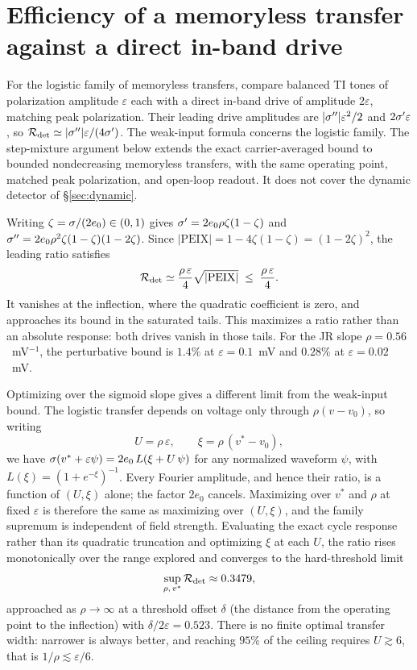 \section{Efficiency of a memoryless transfer against a direct in-band drive}\label{app:bound}
For the logistic family of memoryless transfers, compare balanced TI tones of
polarization amplitude $\varepsilon$ each with a direct in-band drive of amplitude
$2\varepsilon$, matching peak polarization. Their leading drive amplitudes are
$|\sigma''|\varepsilon^2/2$ and $2\sigma'\varepsilon$, so
$\mathcal R_{\rm det}\simeq|\sigma''|\varepsilon/(4\sigma')$.
The weak-input formula concerns the logistic family. The step-mixture argument
below extends the exact carrier-averaged bound to bounded nondecreasing
memoryless transfers, with the same operating point, matched peak polarization,
and open-loop readout. It does not cover the dynamic detector of \S\ref{sec:dynamic}.

Writing $\zeta=\sigma/(2e_0)\in(0,1)$ gives
$\sigma'=2e_0\rho\zeta(1-\zeta)$ and
$\sigma''=2e_0\rho^2\zeta(1-\zeta)(1-2\zeta)$. Since
$|\mathrm{PEIX}|=1-4\zeta(1-\zeta)=(1-2\zeta)^2$, the leading ratio satisfies
\begin{equation}
\mathcal R_{\rm det}\simeq\frac{\rho\,\varepsilon}{4}\sqrt{|\mathrm{PEIX}|}
\;\le\;\frac{\rho\,\varepsilon}{4}.
\label{eq:etabound}
\end{equation}
It vanishes at the inflection, where the quadratic coefficient is zero, and
approaches its bound in the saturated tails. This maximizes a ratio rather than
an absolute response: both drives vanish in those tails. For the JR slope
$\rho=0.56$~mV$^{-1}$, the perturbative bound is $1.4\%$ at
$\varepsilon=0.1$~mV and $0.28\%$ at $\varepsilon=0.02$~mV.

Optimizing over the sigmoid slope gives a different limit from the weak-input bound.
The logistic transfer depends on voltage only through $\rho(v-v_0)$, so writing
\begin{equation}
U=\rho\,\varepsilon,\qquad \xi=\rho\,(v^*-v_0),
\label{eq:reduced}
\end{equation}
we have $\sigma(v^*+\varepsilon\psi)=2e_0\,L(\xi+U\,\psi)$ for any normalized waveform $\psi$,
with $L(\xi)=(1+e^{-\xi})^{-1}$. Every Fourier amplitude, and hence their ratio, is a function
of $(U,\xi)$ alone; the factor $2e_0$ cancels. Maximizing over $v^*$ and $\rho$ at fixed
$\varepsilon$ is therefore the same as maximizing over $(U,\xi)$, and the family supremum is
independent of field strength. Evaluating the exact cycle response rather than its
quadratic truncation and optimizing $\xi$ at each $U$, the ratio rises monotonically over the
range explored and converges to the hard-threshold limit
\begin{equation}
\sup_{\rho,\,v^*}\mathcal R_{\rm det}\approx0.3479 ,
\label{eq:etasup}
\end{equation}
approached as $\rho\to\infty$ at a threshold offset $\delta$ (the distance from the
operating point to the inflection) with $\delta/2\varepsilon=0.523$. There is no
finite optimal transfer width: narrower is always better, and reaching $95\%$ of the ceiling
requires $U\gtrsim6$, that is $1/\rho\lesssim\varepsilon/6$.

